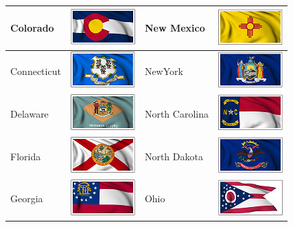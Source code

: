 \documentclass{ximera}
\begin{document}
\begin{center}
\begin{tabular}{|l|l|l|l|}
Colorado & \includegraphics{pics/StateFlags/Colorado.png} & New Mexico & \includegraphics{pics/StateFlags/NewMexico.png} \\\hline 
Connecticut & \includegraphics{pics/StateFlags/Connecticut.png} & NewYork & \includegraphics{pics/StateFlags/NewYork.png} \\\hline 
Delaware & \includegraphics{pics/StateFlags/Delaware.png} & North Carolina & \includegraphics{pics/StateFlags/NorthCarolina.png} \\\hline 
Florida & \includegraphics{pics/StateFlags/Florida.png} & North Dakota & \includegraphics{pics/StateFlags/NorthDakota.png} \\\hline 
Georgia & \includegraphics{pics/StateFlags/Georgia.png} & Ohio & \includegraphics{pics/StateFlags/Ohio.png} \\\hline 

\end{tabular}
\end{center}
\end{document}
